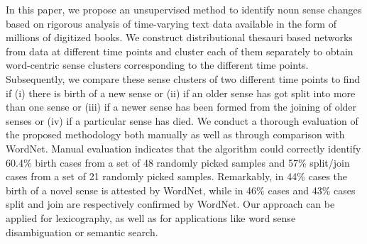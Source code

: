 In this paper, we propose an unsupervised method to identify noun sense changes based on rigorous analysis of time-varying text data available in the form of millions of digitized books. We construct distributional thesauri based networks from data at different time points and cluster each of them separately to obtain word-centric sense clusters corresponding to the different time points. Subsequently, we compare these sense clusters of two different time points to find if (i) there is birth of a new sense or (ii) if an older sense has got split into more than one sense or (iii) if a newer sense has been formed from the joining of older senses or (iv) if a particular sense has died. We conduct a thorough evaluation of the proposed methodology both manually as well as through comparison with WordNet. Manual evaluation indicates that the algorithm could correctly identify 60.4\% birth cases from a set of 48 randomly picked samples and 57\% split/join cases from a set of 21 randomly picked samples. Remarkably, in 44\% cases the birth of a novel sense is attested by WordNet, while in 46\% cases and 43\% cases split and join are respectively confirmed by WordNet. Our approach can be applied for lexicography, as well as for applications like word sense disambiguation or semantic search.
